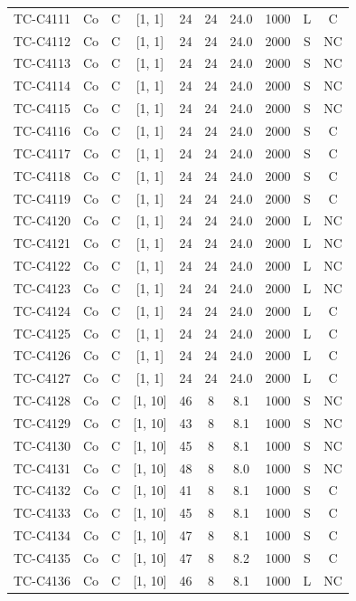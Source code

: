 \begin{longtable}{lccccccccc}
TC-C4111 & Co & C & [1, 1] & 24 & 24 & 24.0 & 1000 & L & C \\
TC-C4112 & Co & C & [1, 1] & 24 & 24 & 24.0 & 2000 & S & NC \\
TC-C4113 & Co & C & [1, 1] & 24 & 24 & 24.0 & 2000 & S & NC \\
TC-C4114 & Co & C & [1, 1] & 24 & 24 & 24.0 & 2000 & S & NC \\
TC-C4115 & Co & C & [1, 1] & 24 & 24 & 24.0 & 2000 & S & NC \\
TC-C4116 & Co & C & [1, 1] & 24 & 24 & 24.0 & 2000 & S & C \\
TC-C4117 & Co & C & [1, 1] & 24 & 24 & 24.0 & 2000 & S & C \\
TC-C4118 & Co & C & [1, 1] & 24 & 24 & 24.0 & 2000 & S & C \\
TC-C4119 & Co & C & [1, 1] & 24 & 24 & 24.0 & 2000 & S & C \\
TC-C4120 & Co & C & [1, 1] & 24 & 24 & 24.0 & 2000 & L & NC \\
TC-C4121 & Co & C & [1, 1] & 24 & 24 & 24.0 & 2000 & L & NC \\
TC-C4122 & Co & C & [1, 1] & 24 & 24 & 24.0 & 2000 & L & NC \\
TC-C4123 & Co & C & [1, 1] & 24 & 24 & 24.0 & 2000 & L & NC \\
TC-C4124 & Co & C & [1, 1] & 24 & 24 & 24.0 & 2000 & L & C \\
TC-C4125 & Co & C & [1, 1] & 24 & 24 & 24.0 & 2000 & L & C \\
TC-C4126 & Co & C & [1, 1] & 24 & 24 & 24.0 & 2000 & L & C \\
TC-C4127 & Co & C & [1, 1] & 24 & 24 & 24.0 & 2000 & L & C \\
TC-C4128 & Co & C & [1, 10] & 46 & 8 & 8.1 & 1000 & S & NC \\
TC-C4129 & Co & C & [1, 10] & 43 & 8 & 8.1 & 1000 & S & NC \\
TC-C4130 & Co & C & [1, 10] & 45 & 8 & 8.1 & 1000 & S & NC \\
TC-C4131 & Co & C & [1, 10] & 48 & 8 & 8.0 & 1000 & S & NC \\
TC-C4132 & Co & C & [1, 10] & 41 & 8 & 8.1 & 1000 & S & C \\
TC-C4133 & Co & C & [1, 10] & 45 & 8 & 8.1 & 1000 & S & C \\
TC-C4134 & Co & C & [1, 10] & 47 & 8 & 8.1 & 1000 & S & C \\
TC-C4135 & Co & C & [1, 10] & 47 & 8 & 8.2 & 1000 & S & C \\
TC-C4136 & Co & C & [1, 10] & 46 & 8 & 8.1 & 1000 & L & NC \\

\end{longtable}
